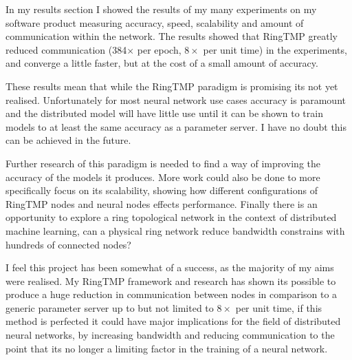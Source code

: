 In my results section I showed the results of my many experiments on my software
product measuring accuracy, speed, scalability and amount of communication
within the network. The results showed that RingTMP greatly reduced
communication (384\(\times\) per epoch, \(8\times\) per unit time) in the
experiments, and converge a little faster, but at the cost
of a small amount of accuracy.

These results mean that while the RingTMP paradigm is promising its not yet
realised. Unfortunately for most neural network use cases accuracy is paramount
and the distributed model will have little use until it can be shown to train
models to at least the same accuracy as a parameter server. I have no doubt this
can be achieved in the future.

Further research of this paradigm is needed to find a way of improving the
accuracy of the models it produces. More work could also be done to more
specifically focus on its scalability, showing how different configurations of
RingTMP nodes and neural nodes effects performance. Finally there is an
opportunity to explore a ring topological network in the context of distributed
machine learning, can a physical ring network reduce bandwidth constrains with
hundreds of connected nodes?

I feel this project has been somewhat of a success, as the majority of my aims
were realised. My RingTMP framework and research has shown its possible to
produce a huge reduction in communication between nodes in comparison to a
generic parameter server up to but not limited to \(8\times\) per unit time, if
this method is perfected it could have major implications for the field of
distributed neural networks, by increasing bandwidth and reducing communication
to the point that its no longer a limiting factor in the training of a neural
network.